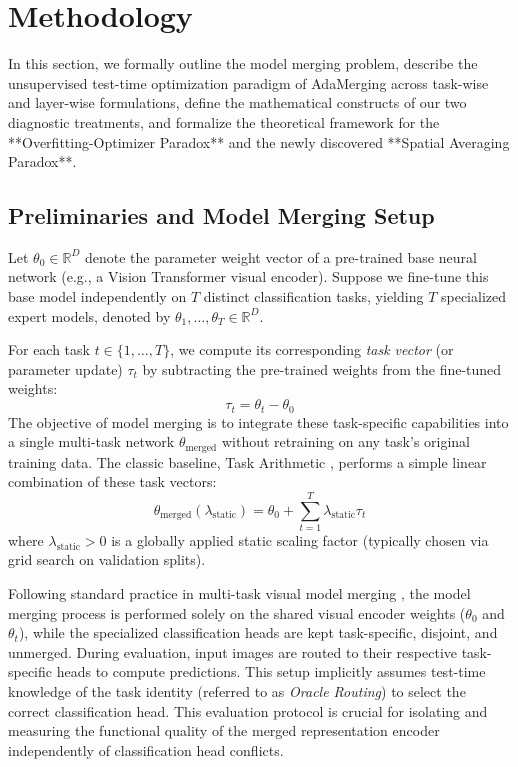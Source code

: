 \section{Methodology}
\label{submission:method}

In this section, we formally outline the model merging problem, describe the unsupervised test-time optimization paradigm of AdaMerging \cite{AdaMerging_ICLR_2024} across task-wise and layer-wise formulations, define the mathematical constructs of our two diagnostic treatments, and formalize the theoretical framework for the **Overfitting-Optimizer Paradox** and the newly discovered **Spatial Averaging Paradox**.

\subsection{Preliminaries and Model Merging Setup}
\label{sub:preliminaries}
Let $\theta_0 \in \mathbb{R}^D$ denote the parameter weight vector of a pre-trained base neural network (e.g., a Vision Transformer visual encoder). Suppose we fine-tune this base model independently on $T$ distinct classification tasks, yielding $T$ specialized expert models, denoted by $\theta_1, \dots, \theta_T \in \mathbb{R}^D$. 

For each task $t \in \{1, \dots, T\}$, we compute its corresponding \emph{task vector} (or parameter update) $\tau_t$ by subtracting the pre-trained weights from the fine-tuned weights:
\begin{equation}
\tau_t = \theta_t - \theta_0
\end{equation}
The objective of model merging is to integrate these task-specific capabilities into a single multi-task network $\theta_{\text{merged}}$ without retraining on any task's original training data. The classic baseline, Task Arithmetic \cite{task_arithmetic}, performs a simple linear combination of these task vectors:
\begin{equation}
\theta_{\text{merged}}(\lambda_{\text{static}}) = \theta_0 + \sum_{t=1}^T \lambda_{\text{static}} \tau_t
\end{equation}
where $\lambda_{\text{static}} > 0$ is a globally applied static scaling factor (typically chosen via grid search on validation splits).

Following standard practice in multi-task visual model merging \cite{task_arithmetic, AdaMerging_ICLR_2024}, the model merging process is performed solely on the shared visual encoder weights ($\theta_0$ and $\theta_t$), while the specialized classification heads are kept task-specific, disjoint, and unmerged. During evaluation, input images are routed to their respective task-specific heads to compute predictions. This setup implicitly assumes test-time knowledge of the task identity (referred to as \emph{Oracle Routing}) to select the correct classification head. This evaluation protocol is crucial for isolating and measuring the functional quality of the merged representation encoder independently of classification head conflicts.

